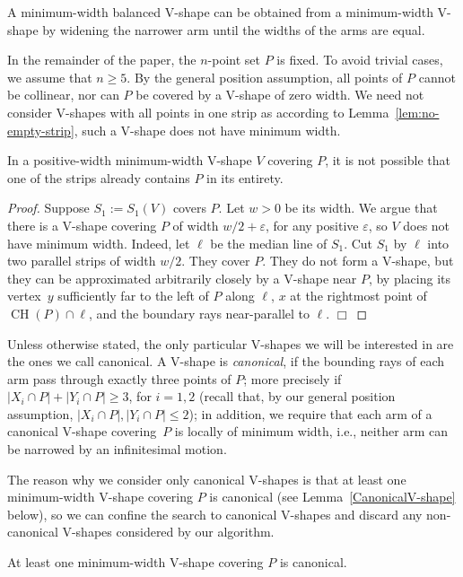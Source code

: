 \documentclass{llncs}
\let\eps\varepsilon
\DeclareMathOperator{\conv}{CH}
\begin{document}
A minimum-width balanced V-shape can be obtained from a minimum-width 
V-shape by widening the narrower arm until the widths of the arms are equal.

In the remainder of the paper, the $n$-point set $P$ is fixed.  To
avoid trivial cases, we assume that $n\geq 5$.  By the general
position assumption, all points of $P$ cannot be collinear, nor can
$P$ be covered by a V-shape of zero width. 
We need not consider V-shapes with all points in one strip as according
to Lemma~\ref{lem:no-empty-strip}, 
such a V-shape does not have minimum width.
\begin{lemma}
  \label{lem:no-empty-strip}
  In a positive-width minimum-width V-shape $V$ covering $P$, it is
  not possible that one of the strips already contains $P$ in its
  entirety.
\end{lemma}
\begin{proof}
  Suppose $S_1:=S_1(V)$ covers $P$.  Let $w>0$ be its width.  We argue
  that there is a V-shape covering $P$ of width $w/2+\eps$, for any
  positive $\eps$, so $V$ does not have minimum width.  Indeed, let
  $\ell$ be the median line of $S_1$.  Cut $S_1$ by $\ell$ into two
  parallel strips of width $w/2$.  They cover $P$.  They do not form a
  V-shape, but they can be approximated arbitrarily closely by a
  V-shape near $P$, by placing its vertex~$y$ sufficiently far to the
  left of $P$ along $\ell$, $x$ at the rightmost point of $\conv(P) \cap
  \ell$, and the boundary rays near-parallel to $\ell$. \hfill $\Box$
\end{proof}

Unless otherwise stated, the only particular V-shapes we will be interested in are the ones we call canonical. A V-shape is \emph{canonical}, if the bounding rays of each arm pass through exactly
three points of $P$; more precisely if $|X_i\cap P|+|Y_i\cap P|\geq3$,
for $i=1,2$ (recall that, by our general position assumption,
$|X_i\cap P|,|Y_i\cap P|\leq 2$); in addition, we require that each arm
of a canonical V-shape covering~$P$ is locally of minimum width, i.e.,
neither arm can be narrowed by an infinitesimal motion.

The reason why we consider only canonical V-shapes is that 
at least one minimum-width V-shape covering $P$ is canonical (see
Lemma~\ref{CanonicalV-shape} below), so we can 
confine the search to canonical V-shapes and 
discard any non-canonical V-shapes considered by our algorithm.


\begin{lemma}
\label{CanonicalV-shape}
At least one minimum-width V-shape covering $P$ is canonical.
\end{lemma}
\end{document}
